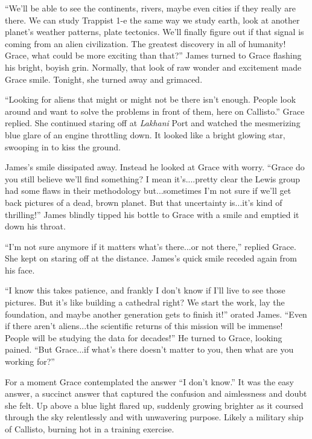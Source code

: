 \documentclass[12pt]{article} %
\begin{document}
``We'll be able to see the continents, rivers, maybe even cities if they really are there. We can study Trappist 1-e the same way we study earth, look at another planet's weather patterns, plate tectonics. We'll finally figure out if that signal is coming from an alien civilization. The greatest discovery in all of humanity! Grace, what could be more exciting than that?'' James turned to Grace flashing his bright, boyish grin. Normally, that look of raw wonder and excitement made Grace smile. Tonight, she turned away and grimaced.

``Looking for aliens that might or might not be there isn't enough. People look around and want to solve the problems in front of them, here on Callisto.'' Grace replied. She continued staring off at \textit{Lakhani} Port and watched the mesmerizing blue glare of an engine throttling down. It looked like a bright glowing star, swooping in to kiss the ground.

James's smile dissipated away. Instead he looked at Grace with worry. ``Grace do you still believe we'll find something? I mean it's....pretty clear the Lewis group had some flaws in their methodology but...sometimes I'm not sure if we'll get back pictures of a dead, brown planet. But that uncertainty is...it's kind of thrilling!'' James blindly tipped his bottle to Grace with a smile and emptied it down his throat.

``I'm not sure anymore if it matters what's there...or not there,'' replied Grace. She kept on staring off at the distance. James's quick smile receded again from his face.

``I know this takes patience, and frankly I don't know if I'll live to see those pictures. But it's like building a cathedral right? We start the work, lay the foundation, and maybe another generation gets to finish it!'' orated James. ``Even if there aren't aliens...the scientific returns of this mission will be immense! People will be studying the data for decades!'' He turned to Grace, looking pained. ``But Grace...if what's there doesn't matter to you, then what are you working for?'' 

For a moment Grace contemplated the answer ``I don't know.'' It was the easy answer, a succinct answer that captured the confusion and aimlessness and doubt she felt. Up above a blue light flared up, suddenly growing brighter as it coursed through the sky relentlessly and with unwavering purpose. Likely a military ship of Callisto, burning hot in a training exercise. 
\end{document}
